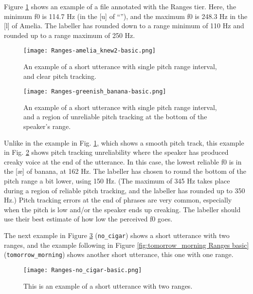 Figure \ref{fig:amelia-knew2 Ranges basic} shows an example of a file annotated with the Ranges tier. Here, the minimum f0 is 114.7 Hz (in the [u] of “”), and the maximum f0 is 248.3 Hz in the [l] of Amelia. The labeller has rounded down to a range minimum of 110 Hz and rounded up to a range maximum of 250 Hz.

\begin{figure}[H]
\centering
%
\texttt{[image: Ranges-amelia\_knew2-basic.png]}
%
\caption{An example of a short utterance with single pitch range interval, and clear pitch tracking.%
\label{fig:amelia-knew2 Ranges basic}%
%
}
\end{figure}

\begin{figure}[H]
\centering
%
\texttt{[image: Ranges-greenish\_banana-basic.png]}
%
\caption[An example of a short utterance with single pitch range interval.]{An example of a short utterance with single pitch range interval, and a region of unreliable pitch tracking at the bottom of the speaker’s range.%
\label{fig:greenish-banana Ranges basic}%
%
}
\end{figure}

Unlike in the example in Fig. \ref{fig:amelia-knew2 Ranges basic}, which shows a smooth pitch track, this example in Fig. \ref{fig:greenish-banana Ranges basic} shows pitch tracking unreliability where the speaker has produced creaky voice at the end of the utterance. In this case, the lowest reliable f0 is in the [æ] of banana, at 162 Hz. The labeller has chosen to round the bottom of the pitch range a bit lower, using 150 Hz. (The maximum of 345 Hz takes place during a region of reliable pitch tracking, and the labeller has rounded up to 350 Hz.) Pitch tracking errors at the end of phrases are very common, especially when the pitch is low and/or the speaker ends up creaking. The labeller should use their best estimate of how low the perceived f0 goes. 

The next example in Figure \ref{fig:no_cigar Ranges basic} (\texttt{no\_cigar}) shows a short utterance with two ranges, and the example following in Figure \ref{fig:tomorrow_morning Ranges basic} (\texttt{tomorrow\_morning}) shows another short utterance, this one with one range.


\begin{figure}[H]
\centering
%
\texttt{[image: Ranges-no\_cigar-basic.png]}
%
\caption{This is an example of a short utterance with two ranges.%
\label{fig:no_cigar Ranges basic}%
%
}
\end{figure}


